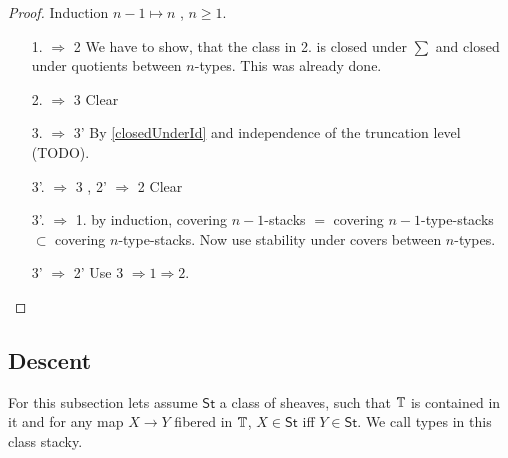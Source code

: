 \documentclass{article}
\newcommand{\St}{\mathsf{St}}
\begin{document}
\begin{proof}
Induction $n-1 \mapsto n$ , $n \ge 1$.
\begin{enumerate}
	\item[1. $\Rightarrow$ 2] We have to show, that the class in 2. is closed under $\sum$ and closed under quotients between $n$-types. This was already done.
	\item [2. $\Rightarrow$ 3] Clear
	\item [3. $\Rightarrow$ 3'] By  \ref{closedUnderId} and independence of the truncation level (TODO).
	\item [3'. $\Rightarrow$ 3 , 2' $\Rightarrow$ 2] Clear

	\item [3'. $\Rightarrow$ 1.]  by induction, covering $n-1$-stacks $=$ covering $n-1$-type-stacks $\subset$ covering $n$-type-stacks. Now use stability under covers between $n$-types.
	\item [3' $\Rightarrow$ 2'] Use 3 $\Rightarrow 1 \Rightarrow 2$.
\end{enumerate}
\end{proof}
\subsection{Descent}
For this subsection lets assume $\St$ a class of sheaves, such that $\mathbb{T}$ is contained in it and for any map $X \to Y$ fibered in $\mathbb{T}$, $X \in \St$ iff $Y \in \St$. We call types in this class stacky.
\end{document}

